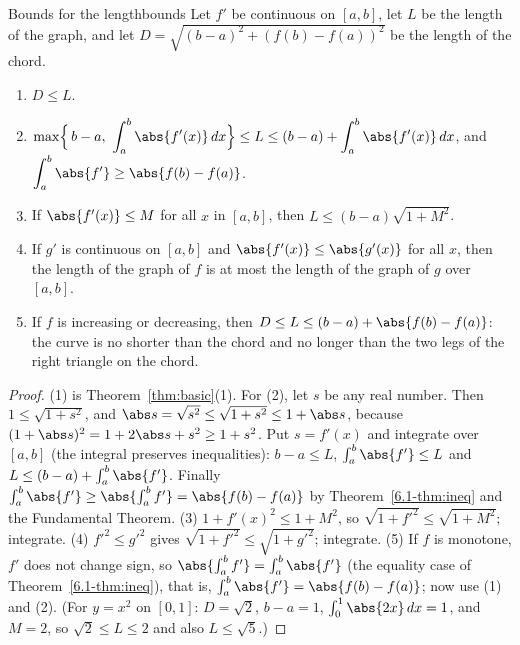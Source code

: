 \documentclass[11pt]{article}
\begin{document}
\begin{thm}{Bounds for the length}{bounds}
Let $f'$ be continuous on $[a,b]$, let $L$ be the length of the graph, and let $D=\sqrt{(b-a)^2+(f(b)-f(a))^2}$ be the length of the chord.
\begin{enumerate}[label=(\arabic*),nosep]
  \item $D\le L$.
  \item $\max\Bigl\{\,b-a,\ \displaystyle\int_a^b\abs{f'(x)}\,dx\Bigr\}\le L\le(b-a)+\displaystyle\int_a^b\abs{f'(x)}\,dx$, and $\displaystyle\int_a^b\abs{f'}\ge\abs{f(b)-f(a)}$.
  \item If $\abs{f'(x)}\le M$ for all $x$ in $[a,b]$, then $L\le(b-a)\sqrt{1+M^2}$.
  \item If $g'$ is continuous on $[a,b]$ and $\abs{f'(x)}\le\abs{g'(x)}$ for all $x$, then the length of the graph of $f$ is at most the length of the graph of $g$ over $[a,b]$.
  \item If $f$ is increasing or decreasing, then $D\le L\le(b-a)+\abs{f(b)-f(a)}$: the curve is no shorter than the chord and no longer than the two legs of the right triangle on the chord.
\end{enumerate}
\end{thm}
\begin{proof}
(1) is Theorem~\ref{thm:basic}(1). For (2), let $s$ be any real number. Then $1\le\sqrt{1+s^2}$, and $\abs s=\sqrt{s^2}\le\sqrt{1+s^2}\le1+\abs s$, because $(1+\abs s)^2=1+2\abs s+s^2\ge1+s^2$. Put $s=f'(x)$ and integrate over $[a,b]$ (the integral preserves inequalities): $b-a\le L$, $\int_a^b\abs{f'}\le L$ and $L\le(b-a)+\int_a^b\abs{f'}$. Finally $\int_a^b\abs{f'}\ge\abs{\int_a^bf'}=\abs{f(b)-f(a)}$ by Theorem~\ref{6.1-thm:ineq} and the Fundamental Theorem. (3) $1+f'(x)^2\le1+M^2$, so $\sqrt{1+f'^2}\le\sqrt{1+M^2}$; integrate. (4) $f'^2\le g'^2$ gives $\sqrt{1+f'^2}\le\sqrt{1+g'^2}$; integrate. (5) If $f$ is monotone, $f'$ does not change sign, so $\abs{\int_a^bf'}=\int_a^b\abs{f'}$ (the equality case of Theorem~\ref{6.1-thm:ineq}), that is, $\int_a^b\abs{f'}=\abs{f(b)-f(a)}$; now use (1) and (2). (For $y=x^2$ on $[0,1]$: $D=\sqrt2$, $b-a=1$, $\int_0^1\abs{2x}\,dx=1$, and $M=2$, so $\sqrt2\le L\le2$ and also $L\le\sqrt5$.)
\end{proof}
\end{document}

